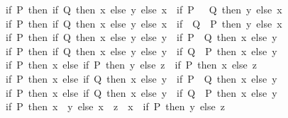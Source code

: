 \begin{isabellebody}
\ \ {\isachardoublequoteopen}{\isacharparenleft}{\kern0pt}if\ P\ then\ {\isacharparenleft}{\kern0pt}if\ Q\ then\ x\ else\ y{\isacharparenright}{\kern0pt}\ else\ x{\isacharparenright}{\kern0pt}\ {\isacharequal}{\kern0pt}\ {\isacharparenleft}{\kern0pt}if\ P\ {\isasymand}\ {\isacharparenleft}{\kern0pt}{\isasymnot}\ Q{\isacharparenright}{\kern0pt}\ then\ y\ else\ x{\isacharparenright}{\kern0pt}{\isachardoublequoteclose}\isanewline
\ \ {\isachardoublequoteopen}{\isacharparenleft}{\kern0pt}if\ P\ then\ {\isacharparenleft}{\kern0pt}if\ Q\ then\ x\ else\ y{\isacharparenright}{\kern0pt}\ else\ x{\isacharparenright}{\kern0pt}\ {\isacharequal}{\kern0pt}\ {\isacharparenleft}{\kern0pt}if\ {\isacharparenleft}{\kern0pt}{\isasymnot}\ Q{\isacharparenright}{\kern0pt}\ {\isasymand}\ P\ then\ y\ else\ x{\isacharparenright}{\kern0pt}{\isachardoublequoteclose}\isanewline
\ \ {\isachardoublequoteopen}{\isacharparenleft}{\kern0pt}if\ P\ then\ {\isacharparenleft}{\kern0pt}if\ Q\ then\ x\ else\ y{\isacharparenright}{\kern0pt}\ else\ y{\isacharparenright}{\kern0pt}\ {\isacharequal}{\kern0pt}\ {\isacharparenleft}{\kern0pt}if\ P\ {\isasymand}\ Q\ then\ x\ else\ y{\isacharparenright}{\kern0pt}{\isachardoublequoteclose}\isanewline
\ \ {\isachardoublequoteopen}{\isacharparenleft}{\kern0pt}if\ P\ then\ {\isacharparenleft}{\kern0pt}if\ Q\ then\ x\ else\ y{\isacharparenright}{\kern0pt}\ else\ y{\isacharparenright}{\kern0pt}\ {\isacharequal}{\kern0pt}\ {\isacharparenleft}{\kern0pt}if\ Q\ {\isasymand}\ P\ then\ x\ else\ y{\isacharparenright}{\kern0pt}{\isachardoublequoteclose}\isanewline
\ \ {\isachardoublequoteopen}{\isacharparenleft}{\kern0pt}if\ P\ then\ x\ else\ if\ P\ then\ y\ else\ z{\isacharparenright}{\kern0pt}\ {\isacharequal}{\kern0pt}\ {\isacharparenleft}{\kern0pt}if\ P\ then\ x\ else\ z{\isacharparenright}{\kern0pt}{\isachardoublequoteclose}\isanewline
\ \ {\isachardoublequoteopen}{\isacharparenleft}{\kern0pt}if\ P\ then\ x\ else\ if\ Q\ then\ x\ else\ y{\isacharparenright}{\kern0pt}\ {\isacharequal}{\kern0pt}\ {\isacharparenleft}{\kern0pt}if\ P\ {\isasymor}\ Q\ then\ x\ else\ y{\isacharparenright}{\kern0pt}{\isachardoublequoteclose}\isanewline
\ \ {\isachardoublequoteopen}{\isacharparenleft}{\kern0pt}if\ P\ then\ x\ else\ if\ Q\ then\ x\ else\ y{\isacharparenright}{\kern0pt}\ {\isacharequal}{\kern0pt}\ {\isacharparenleft}{\kern0pt}if\ Q\ {\isasymor}\ P\ then\ x\ else\ y{\isacharparenright}{\kern0pt}{\isachardoublequoteclose}\isanewline
\ \ {\isachardoublequoteopen}{\isacharparenleft}{\kern0pt}if\ P\ then\ x\ {\isacharequal}{\kern0pt}\ y\ else\ x\ {\isacharequal}{\kern0pt}\ z{\isacharparenright}{\kern0pt}\ {\isacharequal}{\kern0pt}\ {\isacharparenleft}{\kern0pt}x\ {\isacharequal}{\kern0pt}\ {\isacharparenleft}{\kern0pt}if\ P\ then\ y\ else\ z{\isacharparenright}{\kern0pt}{\isacharparenright}{\kern0pt}{\isachardoublequoteclose}\isanewline

\end{isabellebody}
